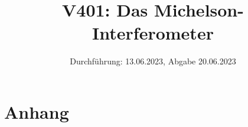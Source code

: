 

\title{V401: Das Michelson-Interferometer}
\date{Durchführung: 13.06.2023, Abgabe 20.06.2023}


\maketitle
\thispagestyle{empty} 
\tableofcontents
\newpage
\setcounter{page}{1}






\printbibliography
\newpage

\section*{Anhang}



